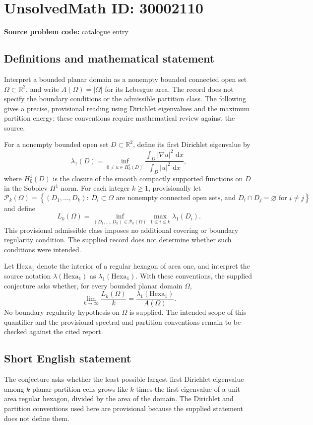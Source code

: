 \documentclass[11pt]{article}
\newcommand{\R}{\mathbb{R}}
\newcommand{\dd}{\,\mathrm{d}}
\begin{document}
\section*{UnsolvedMath ID: 30002110}
\textbf{Source problem code:} catalogue entry
\subsection{Definitions and mathematical statement}
Interpret a bounded planar domain as a nonempty bounded connected open set \(\Omega\subset\R^2\), and write \(A(\Omega)=|\Omega|\) for its Lebesgue area. The record does not specify the boundary conditions or the admissible partition class. The following gives a precise, provisional reading using Dirichlet eigenvalues and the maximum partition energy; these conventions require mathematical review against the source.

For a nonempty bounded open set \(D\subset\R^2\), define its first Dirichlet eigenvalue by
\[
\lambda_1(D)=\inf_{0\ne u\in H_0^1(D)}\frac{\int_D |\nabla u|^2\,\dd x}{\int_D |u|^2\,\dd x},
\]
where \(H_0^1(D)\) is the closure of the smooth compactly supported functions on \(D\) in the Sobolev \(H^1\) norm. For each integer \(k\ge1\), provisionally let
\[
\mathcal P_k(\Omega)=\left\{(D_1,\ldots,D_k):\ D_i\subset\Omega\text{ are nonempty connected open sets, and }D_i\cap D_j=\varnothing\text{ for }i\ne j\right\},
\]
and define
\[
L_k(\Omega)=\inf_{(D_1,\ldots,D_k)\in\mathcal P_k(\Omega)}\max_{1\le i\le k}\lambda_1(D_i).
\]
This provisional admissible class imposes no additional covering or boundary regularity condition. The supplied record does not determine whether such conditions were intended.

Let \(\mathrm{Hexa}_1\) denote the interior of a regular hexagon of area one, and interpret the source notation \(\lambda(\mathrm{Hexa}_1)\) as \(\lambda_1(\mathrm{Hexa}_1)\). With these conventions, the supplied conjecture asks whether, for every bounded planar domain \(\Omega\),
\[
\lim_{k\to\infty}\frac{L_k(\Omega)}{k}=\frac{\lambda_1(\mathrm{Hexa}_1)}{A(\Omega)}.
\]
No boundary regularity hypothesis on \(\Omega\) is supplied. The intended scope of this quantifier and the provisional spectral and partition conventions remain to be checked against the cited report.
\subsection{Short English statement}
The conjecture asks whether the least possible largest first Dirichlet eigenvalue among \(k\) planar partition cells grows like \(k\) times the first eigenvalue of a unit-area regular hexagon, divided by the area of the domain. The Dirichlet and partition conventions used here are provisional because the supplied statement does not define them.
\end{document}
